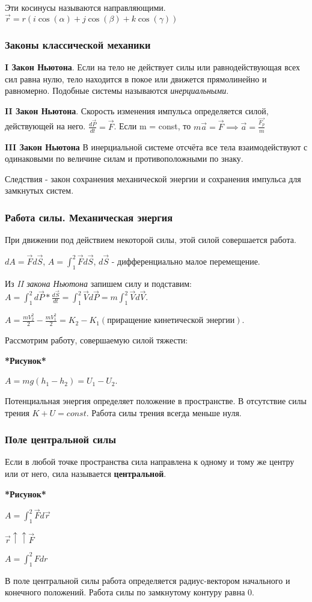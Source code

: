 \documentclass[a4paper,oneside]{article}
\theoremstyle{definition}
\theoremstyle{definition}
\theoremstyle{definition}
\newcommand{\tbf}[1]{\textbf{#1}}
\begin{document}
Эти косинусы называются направляющими. $\vec{r} = r (i\cos(\alpha) + j\cos(\beta) + k\cos(\gamma))$

\subsubsection{Законы классической механики}

\tbf{I Закон Ньютона}. Если на тело не действует силы или равнодействующая всех сил равна нулю,
тело находится в покое или движется прямолинейно и равномерно. Подобные системы называются \textit{инерциальными}.

\tbf{II Закон Ньютона}. Скорость изменения импульса определяется силой, действующей на него. $\frac{d \vec{P}} {dt} = \vec{F}$.
Если m = const, то $m\vec{a}=\vec{F} \implies \vec{a}=\frac{\vec{F_p}} {m}$

\tbf{III Закон Ньютона} В инерциальной системе отсчёта все тела взаимодействуют с одинаковыми по величине силам
и противоположными по знаку.

Следствия - закон сохранения механической энергии и сохранения импульса для замкнутых систем.


\subsubsection{Работа силы. Механическая энергия}
При движении под действием некоторой силы, этой силой совершается работа.

$dA = \vec{F} d \vec{S}$, $A = \int_1^2 \vec{F} d \vec{S}$, $d\vec{S}$ - дифференциально малое перемещение. 

Из \textit{II закона Ньютона} запишем силу и подставим: 
$A = \int_1^2 d \vec{P} * \frac{d \vec{S}} {dt} = \int_1^2 \vec{V} d \vec{P} = m \int_1^2 \vec{V} d \vec{V}$.

$A = \frac{m V_2^2}{2} - \frac{m V_1^2}{2} = K_2 - K_1 (\text{приращение кинетической энергии})$.

Рассмотрим работу, совершаемую силой тяжести:

\tbf{*Рисунок*}

$A = mg(h_1 - h_2) = U_1 - U_2$.

Потенциальная энергия определяет положение в пространстве. В отсутствие силы трения $K + U = const$. 
Работа силы трения всегда меньше нуля.

\subsubsection{Поле центральной силы}
Если в любой точке пространства сила направлена к одному и тому же центру или от него,
сила называется \tbf{центральной}.

\tbf{*Рисунок*}

$A = \int_1^2 \vec{F} d \vec{r}$

$\vec{r} \uparrow \uparrow \vec{F}$

$A = \int_1^2 Fdr$

В поле центральной силы работа определяется радиус-вектором начального и конечного положений.
Работа силы по замкнутому контуру равна 0.
\end{document}
